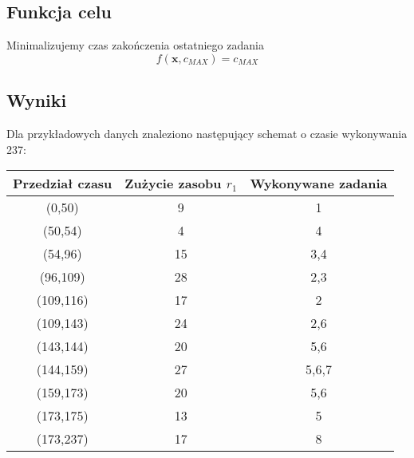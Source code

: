 \documentclass{article}
\def\x{\textbf{x}}
\begin{document}
\subsection{Funkcja celu}
Minimalizujemy czas zakończenia ostatniego zadania
$$f(\x,c_{MAX})=c_{MAX}$$
 

\subsection{Wyniki}
Dla przykładowych danych znaleziono następujący schemat o czasie wykonywania 237:
\begin{center}
\begin{tabular}{|c|c|c|}
\hline
\textbf{Przedział czasu} & \textbf{Zużycie zasobu $r_1$} & \textbf{Wykonywane zadania}\\
\hline
(0,50) & 9 & 1 \\
\hline
(50,54) & 4 & 4 \\
\hline
(54,96) & 15 & 3,4 \\
\hline
(96,109) & 28 & 2,3 \\
\hline
(109,116) & 17 & 2 \\
\hline
(109,143) & 24 & 2,6 \\
\hline
(143,144) & 20 & 5,6 \\
\hline
(144,159) & 27 & 5,6,7 \\
\hline
(159,173) & 20 & 5,6 \\
\hline
(173,175) & 13 & 5 \\
\hline
(173,237) & 17 & 8 \\
\hline
\end{tabular}
\end{center}
\end{document}
